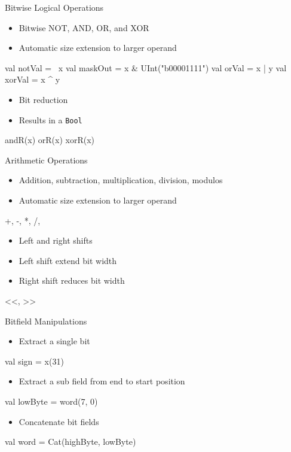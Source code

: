 \documentclass[xcolor=pdflatex,dvipsnames,table]{beamer}
\newcommand{\code}[1]{{\texttt{#1}}}
\begin{document}
\begin{frame}[fragile]{Bitwise Logical Operations}
\begin{itemize}
\item Bitwise NOT, AND, OR, and XOR
\item Automatic size extension to larger operand
\end{itemize}
\begin{chisel}
val notVal = ~x
val maskOut = x & UInt("b00001111")
val orVal = x | y
val xorVal = x ^ y
\end{chisel}
\begin{itemize}
\item Bit reduction
\item Results in a \code{Bool}
\end{itemize}
\begin{chisel}
andR(x)
orR(x)
xorR(x)
\end{chisel}
\end{frame}

\begin{frame}[fragile]{Arithmetic Operations}
\begin{itemize}
\item Addition, subtraction, multiplication, division, modulos
\item Automatic size extension to larger operand
\end{itemize}
\begin{chisel}
+, -, *, /, %
\end{chisel}
\begin{itemize}
\item Left and right shifts
\item Left shift extend bit width
\item Right shift reduces bit width
\end{itemize}
\begin{chisel}
<<, >>
\end{chisel}
\end{frame}

\begin{frame}[fragile]{Bitfield Manipulations}
\begin{itemize}
\item Extract a single bit
\end{itemize}
\begin{chisel}
val sign = x(31)
\end{chisel}
\begin{itemize}
\item Extract a sub field from end to start position
\end{itemize}
\begin{chisel}
val lowByte = word(7, 0)
\end{chisel}
\begin{itemize}
\item Concatenate bit fields
\end{itemize}
\begin{chisel}
val word = Cat(highByte, lowByte)
\end{chisel}
\end{frame}
\end{document}
